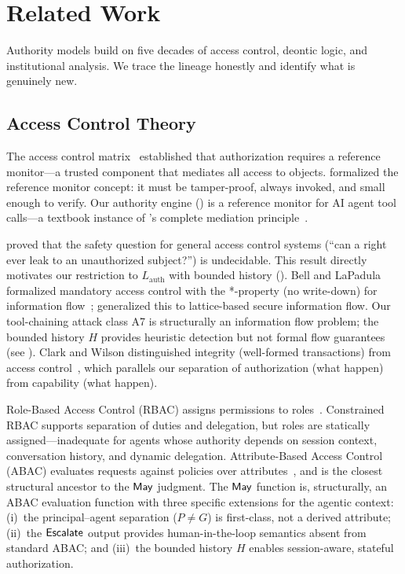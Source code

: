 \documentclass[11pt,a4paper]{article}
\newcommand{\termlabel}[1]{\ifmmode\mathsf{#1}\else{\normalfont\textsc{\MakeLowercase{#1}}}\fi}
\newcommand{\May}{\termlabel{May}}
\newcommand{\Can}{\termlabel{Can}}
\newcommand{\Escalate}{\termlabel{Escalate}}
\begin{document}
\section{Related Work}
\label{sec:related}

Authority models build on five decades of access control, deontic logic, and institutional analysis. We trace the lineage honestly and identify what is genuinely new.

\subsection{Access Control Theory}

The access control matrix~\citep{lampson1971protection} established that authorization requires a reference monitor---a trusted component that mediates all access to objects. \citet{anderson1972planning} formalized the reference monitor concept: it must be tamper-proof, always invoked, and small enough to verify. Our authority engine () is a reference monitor for AI agent tool calls---a textbook instance of \citeauthor{saltzer1975protection}'s complete mediation principle~\citep{saltzer1975protection}.

\citet{harrison1976protection} proved that the safety question for general access control systems (``can a right ever leak to an unauthorized subject?'') is undecidable. This result directly motivates our restriction to $L_{\mathrm{auth}}$ with bounded history (). Bell and LaPadula formalized mandatory access control with the *-property (no write-down) for information flow~\citep{bell1973secure}; \citet{denning1976lattice} generalized this to lattice-based secure information flow. Our tool-chaining attack class A7 is structurally an information flow problem; the bounded history $H$ provides heuristic detection but not formal flow guarantees (see ). Clark and Wilson distinguished integrity (well-formed transactions) from access control~\citep{clark1987comparison}, which parallels our separation of authorization (what \May{} happen) from capability (what \Can{} happen).

Role-Based Access Control (RBAC) assigns permissions to roles~\citep{sandhu1996rbac}. Constrained RBAC supports separation of duties and delegation, but roles are statically assigned---inadequate for agents whose authority depends on session context, conversation history, and dynamic delegation. Attribute-Based Access Control (ABAC) evaluates requests against policies over attributes~\citep{nist2014abac}, and is the closest structural ancestor to the $\May$ judgment. The $\May$ function is, structurally, an ABAC evaluation function with three specific extensions for the agentic context: (i)~the principal--agent separation ($P \neq G$) is first-class, not a derived attribute; (ii)~the $\Escalate$ output provides human-in-the-loop semantics absent from standard ABAC; and (iii)~the bounded history $H$ enables session-aware, stateful authorization.
\end{document}
